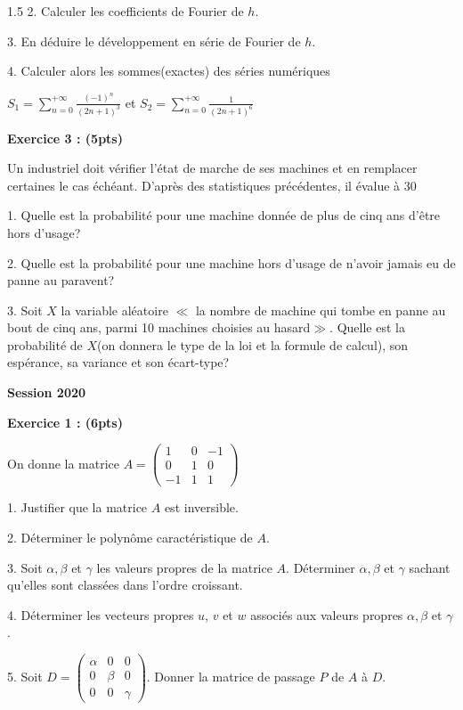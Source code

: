 \documentclass[12pt]{article}
\begin{document}
\begin{spacing}{1.5}
2. Calculer les coefficients de Fourier de $h$.

3. En déduire le développement en série de Fourier de $h$.

4. Calculer alors les sommes(exactes) des séries numériques 

$S_1 = \sum^{+\infty}_{n=0}\frac{(-1)^n}{(2n+1)^3}$ et $S_2 = \sum^{+\infty}_{n=0}\frac{1}{(2n+1)^6}$

\textbf{Exercice 3 : (5pts)}

Un industriel doit vérifier l'état de marche de ses machines et en remplacer certaines le cas échéant. D'après des statistiques précédentes, il évalue à 30%

1. Quelle est la probabilité pour une machine donnée de plus de cinq ans d'être hors d'usage?

2. Quelle est la probabilité pour une machine hors d'usage de n'avoir jamais eu de panne au paravent?

3. Soit $X$ la variable aléatoire $\ll$ {la nombre de machine qui tombe en panne au bout de cinq ans, parmi 10 machines choisies au hasard}$\gg$. Quelle est la probabilité de $X$(on donnera le type de la loi et la formule de calcul), son espérance, sa variance et son écart-type?

\textbf{Session 2020}

\textbf{Exercice 1 : (6pts)}

On donne la matrice $ A= \begin{pmatrix}
1 & 0 & -1\\
0 & 1 & 0\\
-1 & 1 & 1
\end{pmatrix}$                                                                   

1. Justifier que la matrice $A$ est inversible.

2. Déterminer le polynôme caractéristique de $A$.

3. Soit $\alpha, \beta$ et $\gamma$ les valeurs propres de la matrice $A$. Déterminer $\alpha, \beta$ et $\gamma$ sachant qu'elles sont classées dans l'ordre croissant.

4. Déterminer les vecteurs propres $u$, $v$ et $w$ associés aux valeurs propres $\alpha, \beta$ et $\gamma$.

5. Soit $D=\begin{pmatrix}
\alpha & 0 & 0 \\ 
0 & \beta & 0 \\ 
0 & 0 & \gamma
\end{pmatrix} $. Donner la matrice de passage $P$ de $A$ à $D$.


\end{spacing}
\end{document}
